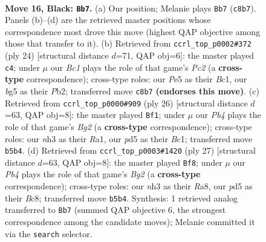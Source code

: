 \documentclass[11pt]{article}
\begin{document}
\clearpage

\begin{figure}[p]\centering
\begin{subfigure}{0.46\textwidth}\centering
\resizebox{\linewidth}{!}{%
\newchessgame
\chessboard[
  setfen={r1b1r1k1/2qn1pbp/p5p1/1ppPp1B1/4P3/1BP4N/P4PPP/R1Q1K2R b - - 1 16},
  showmover=false,
  pgfstyle=straightmove, color=movearrow, markmove={c8-b7}
]}
\caption{}
\end{subfigure}\hfill
\begin{subfigure}{0.46\textwidth}\centering
\resizebox{\linewidth}{!}{%
\newchessgame
\chessboard[
  setfen={rn3k1r/ppqb1p2/2pb1pp1/7p/8/3P1NP1/PPP1QPBP/R1B2RK1 w - - 0 13},
  showmover=false,
  pgfstyle=straightmove, color=movearrow, markmove={c2-c4}
]}
\caption{}
\end{subfigure}
\\[4pt]
\begin{subfigure}{0.46\textwidth}\centering
\resizebox{\linewidth}{!}{%
\newchessgame
\chessboard[
  setfen={r1bqr1k1/1p3pp1/2pb1n1p/p3p3/P3P3/2P2NP1/1PQ2PBP/R1B1R1K1 w - - 1 14},
  showmover=false,
  pgfstyle=straightmove, color=movearrow, markmove={g2-f1}
]}
\caption{}
\end{subfigure}\hfill
\begin{subfigure}{0.46\textwidth}\centering
\resizebox{\linewidth}{!}{%
\newchessgame
\chessboard[
  setfen={r1b1r1k1/1pq2pbp/2p2np1/p3p3/P3P3/2PB1N1P/1P3PP1/R1BQR1K1 b - - 1 14},
  showmover=false,
  pgfstyle=straightmove, color=movearrow, markmove={g7-f8}
]}
\caption{}
\end{subfigure}
\caption{\textbf{Move 16, Black: \texttt{Bb7}.} (a) Our position; Melanie plays \texttt{Bb7} (\texttt{c8b7}). Panels (b)--(d) are the retrieved master positions whose correspondence most drove this move (highest QAP objective among those that transfer to it). (b) Retrieved from \texttt{ccrl\_top\_p0002\#372} (ply 24) [structural distance $d$=71, QAP obj=6]: the master played \texttt{c4}; under $\mu$ our \emph{Bc1} plays the role of that game's \emph{Pc2} (a \textbf{cross-type} correspondence); cross-type roles: our \emph{P}e5 as their \emph{B}c1, our \emph{b}g5 as their \emph{P}b2; transferred move \texttt{c8b7} \textbf{(endorses this move)}. (c) Retrieved from \texttt{ccrl\_top\_p0000\#909} (ply 26) [structural distance $d$=63, QAP obj=8]: the master played \texttt{Bf1}; under $\mu$ our \emph{Pb4} plays the role of that game's \emph{Bg2} (a \textbf{cross-type} correspondence); cross-type roles: our \emph{n}h3 as their \emph{R}a1, our \emph{p}d5 as their \emph{B}c1; transferred move \texttt{b5b4}. (d) Retrieved from \texttt{ccrl\_top\_p0003\#1420} (ply 27) [structural distance $d$=63, QAP obj=8]: the master played \texttt{Bf8}; under $\mu$ our \emph{Pb4} plays the role of that game's \emph{Bg2} (a \textbf{cross-type} correspondence); cross-type roles: our \emph{n}h3 as their \emph{R}a8, our \emph{p}d5 as their \emph{B}c8; transferred move \texttt{b5b4}. Synthesis: 1 retrieved analog transferred to \texttt{Bb7} (summed QAP objective 6, the strongest correspondence among the candidate moves); Melanie committed it via the \texttt{search} selector.}
\label{fig:thought-m31}
\end{figure}
\end{document}
